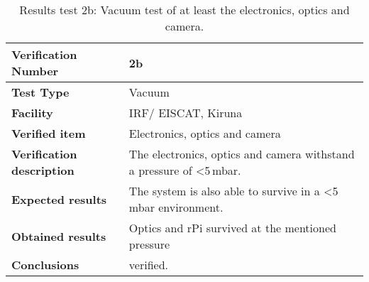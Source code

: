 \begin{table}[H]
\centering

\begin{tabular}{|m{}| m{} |}
\hline
\textbf{Verification Number} 		& 2b 							 \\ \hline
\textbf{Test Type} 					& Vacuum				 \\ \hline
\textbf{Facility} 					& IRF/ EISCAT, Kiruna 			 \\ \hline
\textbf{Verified item} 				& Electronics, optics and camera \\ \hline

\textbf{Verification description} 	& The electronics, optics and camera withstand a pressure of <5\,mbar. \\ \hline

\textbf{Expected results} 			& The system is also able to survive in a <5\,mbar environment.\\ \hline

\textbf{Obtained results} 			& Optics and rPi survived at the mentioned pressure \\ \hline

\textbf{Conclusions} 				&  verified.		\\ \hline
\end{tabular}
\caption{Results test 2b: Vacuum test of at least the electronics, optics and camera.}
\label{tab:testresult2:vacuum}
\end{table}


\raggedbottom